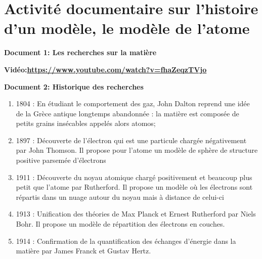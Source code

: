 \documentclass[french]{article}
\begin{document}
\clearpage
\section*{Activité documentaire sur l'histoire d'un modèle, le modèle de l'atome}

\begin{mdframed}[style=doc, leftmargin=0pt, rightmargin=0pt, innertopmargin=8pt, innerbottommargin=8pt, innerrightmargin=10pt, innerleftmargin=10pt]
	\noindent\textbf{Document 1: Les recherches sur la matière}

\textbf{Vidéo:\url{https://www.youtube.com/watch?v=fhaZeqzTVjo}}
\end{mdframed}

\begin{mdframed}[style=doc, leftmargin=0pt, rightmargin=0pt, innertopmargin=8pt, innerbottommargin=8pt, innerrightmargin=10pt, innerleftmargin=10pt]
	\noindent\textbf{Document 2: Historique des recherches}
\begin{enumerate}
	\item  1804 : En étudiant le comportement des gaz, John Dalton reprend une idée de la Grèce antique longtemps abandonnée : la matière est composée de petits grains insécables appelés alors atomos;
	\item  1897 : Découverte de l'électron qui est une particule chargée négativement par John Thomson. Il propose pour l'atome un modèle de sphère de structure positive parsemée d'électrons
	\item 1911 : Découverte du noyau atomique chargé positivement et beaucoup plus petit que l'atome par Rutherford. Il propose un modèle où les électrons sont répartis dans un nuage autour du noyau mais à distance de celui-ci
	\item 1913 : Unification des théories de Max Planck et Ernest Rutherford par Niels Bohr. Il propose un modèle de répartition des électrons en couches.
	\item 1914 : Confirmation de la quantification des échanges d'énergie dans la matière par James Franck et Gustav Hertz.
\end{enumerate}

\end{mdframed}
\end{document}
